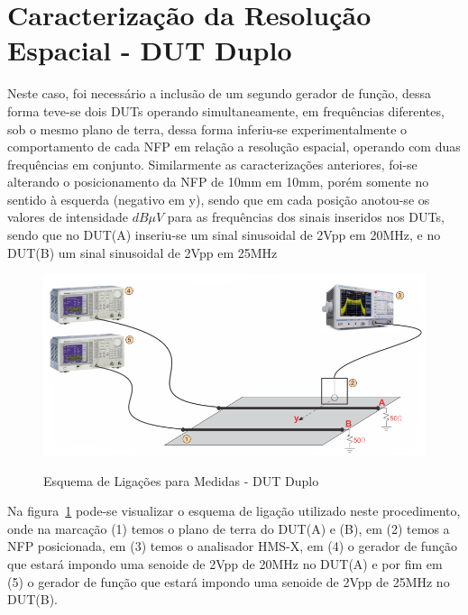 
\section{Caracterização da Resolução Espacial - DUT Duplo}
Neste caso, foi necessário a inclusão de um segundo gerador de função, dessa forma teve-se dois DUTs operando simultaneamente, em frequências diferentes, sob o mesmo plano de terra, dessa forma inferiu-se experimentalmente o comportamento de cada NFP em relação a resolução espacial, operando com duas frequências em conjunto. Similarmente as caracterizações anteriores, foi-se alterando o posicionamento da NFP de 10mm em 10mm, porém somente no sentido à esquerda (negativo em y), sendo que em cada posição anotou-se os valores de intensidade $dB\mu V$ para as frequências dos sinais inseridos nos DUTs, sendo que no DUT(A) inseriu-se um sinal sinusoidal de 2Vpp em 20MHz, e no DUT(B) um sinal sinusoidal de 2Vpp em 25MHz

\begin{figure}[htb!]
	\centering 
	\caption{Esquema de Ligações para Medidas - DUT Duplo}
	\includegraphics[scale=2.4]{./img/esquema1_fundo}
	\label{fig:esquema1_fundo}
\end{figure}

Na figura~\ref{fig:esquema1_fundo} pode-se visualizar o esquema de ligação utilizado neste procedimento, onde na marcação (1) temos o plano de terra do DUT(A) e (B), em (2) temos a NFP posicionada, em (3) temos o analisador HMS-X, em (4) o gerador de função que estará impondo uma senoide de 2Vpp de 20MHz no DUT(A) e por fim em (5) o gerador de função que estará impondo uma senoide de 2Vpp de 25MHz no DUT(B).

